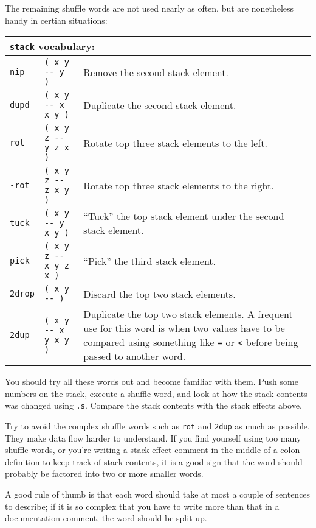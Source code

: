 \documentclass[english]{book}
\newcommand{\wordtable}[1]{{
\begin{tabularx}{12cm}{|l l X|}
#1
\hline
\end{tabularx}}}
\newcommand{\tabvocab}[1]{
\hline
\multicolumn{3}{|l|}{
\rule[-2mm]{0mm}{6mm}
\texttt{#1} vocabulary:}
\\
\hline
}
\begin{document}
The remaining shuffle words are not used nearly as often, but are nonetheless handy in certian situations:

\wordtable{
\tabvocab{stack}
\texttt{nip}&
\texttt{( x y -{}- y )}&
Remove the second stack element.\\
\texttt{dupd}&
\texttt{( x y -{}- x x y )}&
Duplicate the second stack element.\\
\texttt{rot}&
\texttt{( x y z -{}- y z x )}&
Rotate top three stack elements
to the left.\\
\texttt{-rot}&
\texttt{( x y z -{}- z x y )}&
Rotate top three stack elements
to the right.\\
\texttt{tuck}&
\texttt{( x y -{}- y x y )}&
``Tuck'' the top stack element under
the second stack element.\\
\texttt{pick}&
\texttt{( x y z -{}- x y z x )}&
``Pick'' the third stack element.\\
\texttt{2drop}&
\texttt{( x y -{}- )}&
Discard the top two stack elements.\\
\texttt{2dup}&
\texttt{( x y -{}- x y x y )}&
Duplicate the top two stack elements. A frequent use for this word is when two values have to be compared using something like \texttt{=} or \texttt{<} before being passed to another word.\\
}

You should try all these words out and become familiar with them. Push some numbers on the stack,
execute a shuffle word, and look at how the stack contents was changed using
\texttt{.s}. Compare the stack contents with the stack effects above.

Try to avoid the complex shuffle words such as \texttt{rot} and \texttt{2dup} as much as possible. They make data flow harder to understand. If you find yourself using too many shuffle words, or you're writing
a stack effect comment in the middle of a colon definition to keep track of stack contents, it is
a good sign that the word should probably be factored into two or
more smaller words.

A good rule of thumb is that each word should take at most a couple of sentences to describe; if it is so complex that you have to write more than that in a documentation comment, the word should be split up.
\end{document}
